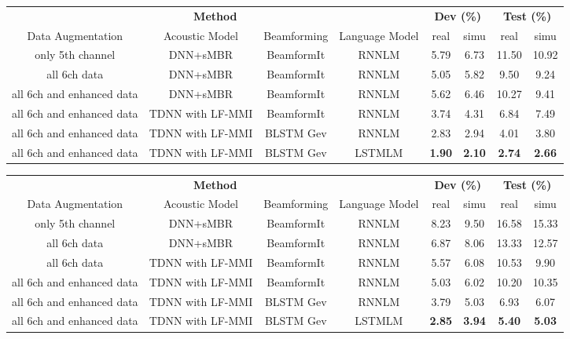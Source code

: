 \documentclass[a4paper]{article}
\begin{document}
\begin{table*}[tbh]
  \caption{WER of 6 channel track experiments}
  \label{tab:6ch}
  \centering
  \begin{tabular}{ c c c c c c c c }
    \toprule
    \multicolumn{4}{c}{\textbf{Method}} & \multicolumn{2}{c}{\textbf{Dev (\%)}} & \multicolumn{2}{c}{\textbf{Test (\%)}} \\
   	Data Augmentation & Acoustic Model & Beamforming & Language Model & real & simu & real & simu \\
   	\midrule
    only 5th channel & DNN+sMBR & BeamformIt & RNNLM & 5.79 & 6.73 & 11.50 & 10.92 \\
    all 6ch data & DNN+sMBR & BeamformIt & RNNLM & 5.05 & 5.82 & 9.50 & 9.24 \\
    all 6ch and enhanced data & DNN+sMBR & BeamformIt & RNNLM & 5.62 & 6.46 & 10.27 & 9.41 \\
    all 6ch and enhanced data & TDNN with LF-MMI & BeamformIt & RNNLM & 3.74 & 4.31 & 6.84 & 7.49 \\
    all 6ch and enhanced data & TDNN with LF-MMI & BLSTM Gev & RNNLM & 2.83 & 2.94 & 4.01 & 3.80 \\
    all 6ch and enhanced data & TDNN with LF-MMI & BLSTM Gev & LSTMLM & \textbf{1.90} & \textbf{2.10} & \textbf{2.74} & \textbf{2.66} \\
    \bottomrule
  \end{tabular}
  
\bigskip
\caption{WER of 2 channel track experiments}
  \label{tab:2ch}
  \centering
  \begin{tabular}{ c c c c c c c c }
    \toprule
    \multicolumn{4}{c}{\textbf{Method}} & \multicolumn{2}{c}{\textbf{Dev (\%)}} & \multicolumn{2}{c}{\textbf{Test (\%)}} \\
   	Data Augmentation & Acoustic Model & Beamforming & Language Model & real & simu & real & simu \\
   	\midrule
    only 5th channel & DNN+sMBR & BeamformIt & RNNLM & 8.23 & 9.50 & 16.58 & 15.33 \\
    all 6ch data & DNN+sMBR & BeamformIt & RNNLM & 6.87 & 8.06 & 13.33 & 12.57 \\
    all 6ch data & TDNN with LF-MMI & BeamformIt & RNNLM & 5.57 & 6.08 & 10.53 & 9.90 \\
    all 6ch and enhanced data & TDNN with LF-MMI & BeamformIt & RNNLM & 5.03 & 6.02 & 10.20 & 10.35 \\
    all 6ch and enhanced data & TDNN with LF-MMI & BLSTM Gev & RNNLM & 3.79 & 5.03 & 6.93 & 6.07 \\
    all 6ch and enhanced data & TDNN with LF-MMI & BLSTM Gev & LSTMLM & \textbf{2.85} & \textbf{3.94} & \textbf{5.40} & \textbf{5.03} \\
    \bottomrule
  \end{tabular}
  

\end{table*}
\end{document}
